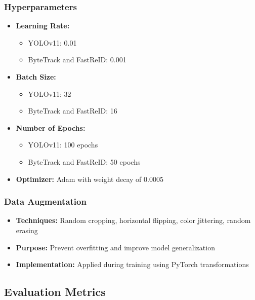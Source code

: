\subsubsection{Hyperparameters}
\label{subsubsection:hyperparameters}

\begin{itemize}
    \item \textbf{Learning Rate:} 
    \begin{itemize}
        \item YOLOv11: 0.01
        \item ByteTrack and FastReID: 0.001
    \end{itemize}
    \item \textbf{Batch Size:} 
    \begin{itemize}
        \item YOLOv11: 32
        \item ByteTrack and FastReID: 16
    \end{itemize}
    \item \textbf{Number of Epochs:}
    \begin{itemize}
        \item YOLOv11: 100 epochs
        \item ByteTrack and FastReID: 50 epochs
    \end{itemize}
    \item \textbf{Optimizer:} Adam with weight decay of 0.0005
\end{itemize}

\subsubsection{Data Augmentation}
\label{subsubsection:data-augmentation}

\begin{itemize}
    \item \textbf{Techniques:} Random cropping, horizontal flipping, color jittering, random erasing
    \item \textbf{Purpose:} Prevent overfitting and improve model generalization
    \item \textbf{Implementation:} Applied during training using PyTorch transformations
\end{itemize}

\subsection{Evaluation Metrics}
\label{subsection:evaluation-metrics}

